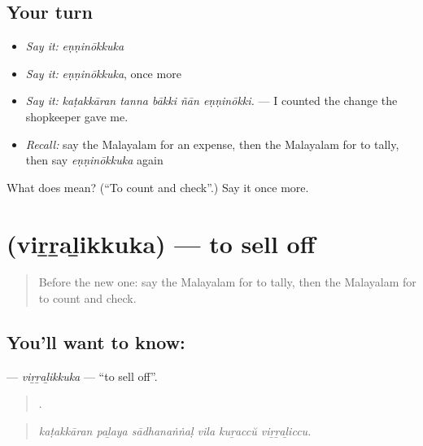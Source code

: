 \subsection*{Your turn}
\begin{itemize}
\raggedright
  \item \emph{Say it:} \emph{eṇṇinōkkuka}
  \item \emph{Say it:} \emph{eṇṇinōkkuka}, once more
  \item \emph{Say it:} \emph{kaṭakkāran tanna bākki ñān eṇṇinōkki.} — I counted the change the shopkeeper gave me.
  \item \emph{Recall:} say the Malayalam for an expense, then the Malayalam for to tally, then say \emph{eṇṇinōkkuka} again
\end{itemize}

\begin{tcolorbox}[breakable,colback=teal!4,colframe=teal!35!black,title={Before you move on}]
What does  mean? (\textquotedblleft{}To count and check\textquotedblright{}.) Say it once more.
\end{tcolorbox}
\section[\texorpdfstring{\ml{വിറ്റഴിക്കുക} (viṟṟaḻikkuka)}{വിറ്റഴിക്കുക (viṟṟaḻikkuka)}]{ (viṟṟaḻikkuka) — to sell off}

\label{lesson:ML-C494-virralikkuka}



\begin{quote}
Before the new one: say the Malayalam for to tally, then the Malayalam for to count and check.
\end{quote}

\subsection*{You'll want to know: }
\textbf{} — \emph{viṟṟaḻikkuka} — \textquotedblleft{}to sell off\textquotedblright{}.

\begin{quote}
     .
\end{quote}

\begin{quote}
\emph{kaṭakkāran paḻaya sādhanaṅṅaḷ vila kuṟaccŭ viṟṟaḻiccu.}
\end{quote}

